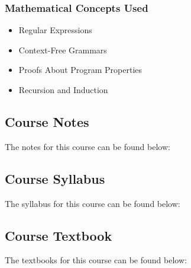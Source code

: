 {\begin{highlight}[\CSPBPPL]
        \subsubsection*{Mathematical Concepts Used}
        
        \begin{itemize}
            \item Regular Expressions
            \item Context-Free Grammars
            \item Proofs About Program Properties
            \item Recursion and Induction
        \end{itemize}
    \end{highlight}
}

\subsection{Course Notes}

The notes for this course can be found below:

\subsection{Course Syllabus}

The syllabus for this course can be found below: \coursedoc{\CSPBPPLSyllabus}

\subsection{Course Textbook}

The textbooks for this course can be found below: \coursedoc{\CSPBAtomicScalaTextbook} \coursedoc{\CSPBEssenPPLTextbook} \coursedoc{\CSPBFuncProgTextbook} \coursedoc{\CSPBProgInScalTextbook}